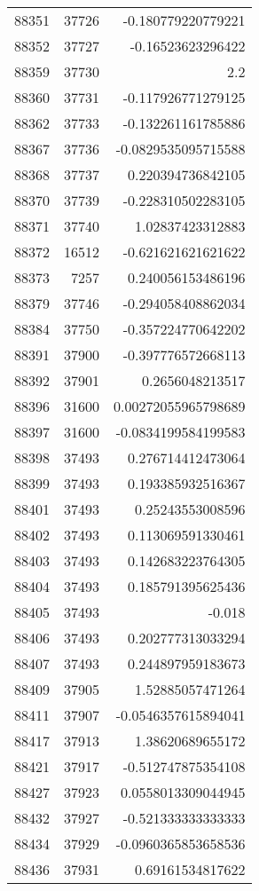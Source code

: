 \begin{tabular}{r | r | r}
88351 & 37726 & -0.180779220779221 \\
88352 & 37727 & -0.16523623296422 \\
88359 & 37730 & 2.2 \\
88360 & 37731 & -0.117926771279125 \\
88362 & 37733 & -0.132261161785886 \\
88367 & 37736 & -0.0829535095715588 \\
88368 & 37737 & 0.220394736842105 \\
88370 & 37739 & -0.228310502283105 \\
88371 & 37740 & 1.02837423312883 \\
88372 & 16512 & -0.621621621621622 \\
88373 & 7257 & 0.240056153486196 \\
88379 & 37746 & -0.294058408862034 \\
88384 & 37750 & -0.357224770642202 \\
88391 & 37900 & -0.397776572668113 \\
88392 & 37901 & 0.2656048213517 \\
88396 & 31600 & 0.00272055965798689 \\
88397 & 31600 & -0.0834199584199583 \\
88398 & 37493 & 0.276714412473064 \\
88399 & 37493 & 0.193385932516367 \\
88401 & 37493 & 0.25243553008596 \\
88402 & 37493 & 0.113069591330461 \\
88403 & 37493 & 0.142683223764305 \\
88404 & 37493 & 0.185791395625436 \\
88405 & 37493 & -0.018 \\
88406 & 37493 & 0.202777313033294 \\
88407 & 37493 & 0.244897959183673 \\
88409 & 37905 & 1.52885057471264 \\
88411 & 37907 & -0.0546357615894041 \\
88417 & 37913 & 1.38620689655172 \\
88421 & 37917 & -0.512747875354108 \\
88427 & 37923 & 0.0558013309044945 \\
88432 & 37927 & -0.521333333333333 \\
88434 & 37929 & -0.0960365853658536 \\
88436 & 37931 & 0.69161534817622 \\

\end{tabular}
